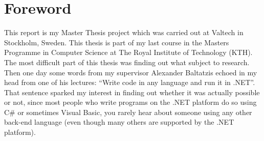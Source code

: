 \chapter*{Foreword}

This report is my Master Thesis project which was carried out at Valtech in Stockholm, Sweden. This thesis is part of my last course in the Masters Programme in Computer Science at The Royal Institute of Technology (KTH). The most difficult part of this thesis was finding out what subject to research. Then one day some words from my supervisor Alexander Baltatzis echoed in my head from one of his lectures: ``Write code in any language and run it in .NET''. That sentence sparked my interest in finding out whether it was actually possible or not, since most people who write programs on the .NET platform do so using C\# or sometimes Visual Basic, you rarely hear about someone using any other back-end language (even though many others are supported by the .NET platform). 